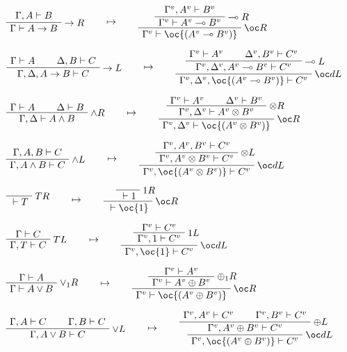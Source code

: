 \(\AxRule{\Gamma,A\vdash B}
\LabelRule{\imp R}
\UnaRule{\Gamma\vdash A\imp B}
\DisplayProof
\qquad\mapsto\qquad
\AxRule{\Gamma^v,A^v\vdash B^v}
\LabelRule{\limp R}
\UnaRule{\Gamma^v\vdash A^v\limp B^v}
\LabelRule{\oc R}
\UnaRule{\Gamma^v\vdash \oc{(A^v\limp B^v)}}
\DisplayProof\)

\(\AxRule{\Gamma\vdash A}
\AxRule{\Delta,B\vdash C}
\LabelRule{\imp L}
\BinRule{\Gamma,\Delta,A\imp B\vdash C}
\DisplayProof
\qquad\mapsto\qquad
\AxRule{\Gamma^v\vdash A^v}
\AxRule{\Delta^v,B^v\vdash C^v}
\LabelRule{\limp L}
\BinRule{\Gamma^v,\Delta^v,A^v\limp B^v\vdash C^v}
\LabelRule{\oc d L}
\UnaRule{\Gamma^v,\Delta^v,\oc{(A^v\limp B^v)}\vdash C^v}
\DisplayProof\)

\(\AxRule{\Gamma\vdash A}
\AxRule{\Delta\vdash B}
\LabelRule{\wedge R}
\BinRule{\Gamma,\Delta\vdash A\wedge B}
\DisplayProof
\qquad\mapsto\qquad
\AxRule{\Gamma^v\vdash A^v}
\AxRule{\Delta^v\vdash B^v}
\LabelRule{\tens R}
\BinRule{\Gamma^v,\Delta^v\vdash A^v\tens B^v}
\LabelRule{\oc R}
\UnaRule{\Gamma^v,\Delta^v\vdash \oc{(A^v\tens B^v)}}
\DisplayProof\)

\(\AxRule{\Gamma,A,B\vdash C}
\LabelRule{\wedge L}
\UnaRule{\Gamma,A\wedge B\vdash C}
\DisplayProof
\qquad\mapsto\qquad
\AxRule{\Gamma^v,A^v,B^v\vdash C^v}
\LabelRule{\tens L}
\UnaRule{\Gamma^v,A^v\tens B^v\vdash C^v}
\LabelRule{\oc d L}
\UnaRule{\Gamma^v,\oc{(A^v\tens B^v)}\vdash C^v}
\DisplayProof\)

\(\LabelRule{T R}
\NulRule{{}\vdash T}
\DisplayProof
\qquad\mapsto\qquad
\LabelRule{\one R}
\NulRule{{}\vdash \one}
\LabelRule{\oc R}
\UnaRule{{}\vdash \oc{\one}}
\DisplayProof\)

\(\AxRule{\Gamma\vdash C}
\LabelRule{T L}
\UnaRule{\Gamma,T\vdash C}
\DisplayProof
\qquad\mapsto\qquad
\AxRule{\Gamma^v\vdash C^v}
\LabelRule{\one L}
\UnaRule{\Gamma^v,\one\vdash C^v}
\LabelRule{\oc d L}
\UnaRule{\Gamma^v,\oc{\one}\vdash C^v}
\DisplayProof\)

\(\AxRule{\Gamma\vdash A}
\LabelRule{\vee_1 R}
\UnaRule{\Gamma\vdash A\vee B}
\DisplayProof
\qquad\mapsto\qquad
\AxRule{\Gamma^v\vdash A^v}
\LabelRule{\plus_1 R}
\UnaRule{\Gamma^v\vdash A^v\plus B^v}
\LabelRule{\oc R}
\UnaRule{\Gamma^v\vdash \oc{(A^v\plus B^v)}}
\DisplayProof\)

\(\AxRule{\Gamma,A\vdash C}
\AxRule{\Gamma,B\vdash C}
\LabelRule{\vee L}
\BinRule{\Gamma,A\vee B\vdash C}
\DisplayProof
\qquad\mapsto\qquad
\AxRule{\Gamma^v,A^v\vdash C^v}
\AxRule{\Gamma^v,B^v\vdash C^v}
\LabelRule{\plus L}
\BinRule{\Gamma^v,A^v\plus B^v\vdash C^v}
\LabelRule{\oc d L}
\UnaRule{\Gamma^v,\oc{(A^v\plus B^v)}\vdash C^v}
\DisplayProof\)

